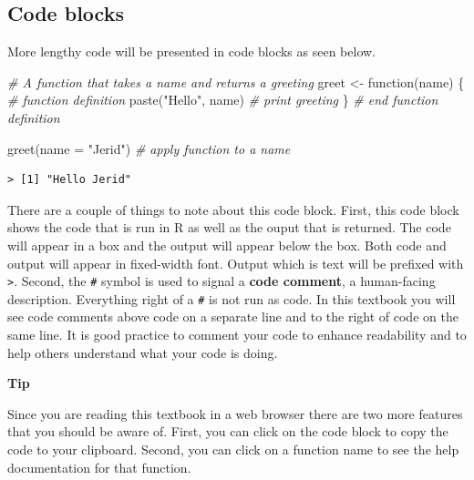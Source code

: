 \documentclass[
  letterpaper,
]{latex/krantz}
\newenvironment{Shaded}{\begin{snugshade}}{\end{snugshade}}
\newcommand{\AttributeTok}[1]{\textcolor[rgb]{0.00,0.00,0.00}{#1}}
\newcommand{\CommentTok}[1]{\textcolor[rgb]{0.00,0.00,0.00}{\textit{#1}}}
\newcommand{\ControlFlowTok}[1]{\textcolor[rgb]{0.00,0.00,0.00}{#1}}
\newcommand{\FunctionTok}[1]{\textcolor[rgb]{0.00,0.00,0.00}{#1}}
\newcommand{\NormalTok}[1]{\textcolor[rgb]{0.00,0.00,0.00}{#1}}
\newcommand{\OtherTok}[1]{\textcolor[rgb]{0.00,0.00,0.00}{#1}}
\newcommand{\StringTok}[1]{\textcolor[rgb]{0.00,0.00,0.00}{#1}}
\begin{document}
\hypertarget{code-blocks}{%
\subsection*{Code blocks}\label{code-blocks}}

More lengthy code will be presented in code blocks as seen below.

\begin{Shaded}
\begin{Highlighting}[]
\CommentTok{\# A function that takes a name and returns a greeting}
\NormalTok{greet }\OtherTok{\textless{}{-}} \ControlFlowTok{function}\NormalTok{(name) \{ }\CommentTok{\# function definition}
  \FunctionTok{paste}\NormalTok{(}\StringTok{"Hello"}\NormalTok{, name) }\CommentTok{\# print greeting}
\NormalTok{\} }\CommentTok{\# end function definition}

\FunctionTok{greet}\NormalTok{(}\AttributeTok{name =} \StringTok{"Jerid"}\NormalTok{) }\CommentTok{\# apply function to a name}
\end{Highlighting}
\end{Shaded}

\begin{verbatim}
> [1] "Hello Jerid"
\end{verbatim}

There are a couple of things to note about this code block. First, this
code block shows the code that is run in R as well as the ouput that is
returned. The code will appear in a box and the output will appear below
the box. Both code and output will appear in fixed-width font. Output
which is text will be prefixed with \texttt{\textgreater{}}. Second, the
\texttt{\#} symbol is used to signal a \textbf{code comment}, a
human-facing description. Everything right of a \texttt{\#} is not run
as code. In this textbook you will see code comments above code on a
separate line and to the right of code on the same line. It is good
practice to comment your code to enhance readability and to help others
understand what your code is doing.

\begin{tcolorbox}[enhanced jigsaw, arc=.35mm, leftrule=.75mm, rightrule=.15mm, opacityback=0, colback=white, breakable, bottomrule=.15mm, left=2mm, toprule=.15mm]

\textbf{ Tip}

Since you are reading this textbook in a web browser there are two more
features that you should be aware of. First, you can click on the code
block to copy the code to your clipboard. Second, you can click on a
function name to see the help documentation for that function.

\end{tcolorbox}
\end{document}
